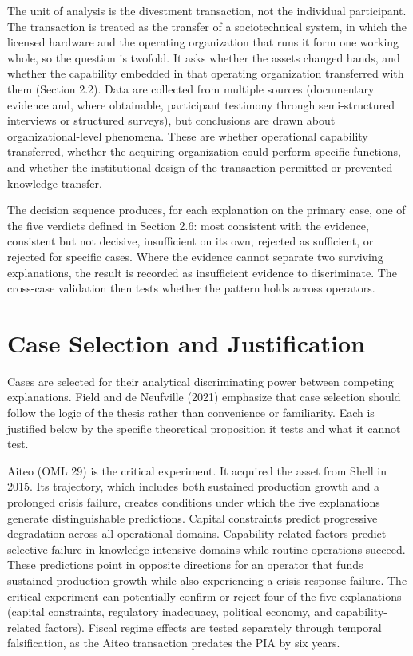 \documentclass[twoside,fontset=lmodern]{mitthesis}
\begin{document}
The unit of analysis is the divestment transaction, not the individual
participant. The transaction is treated as the transfer of a
sociotechnical system, in which the licensed hardware and the operating
organization that runs it form one working whole, so the question is
twofold. It asks whether the assets changed hands, and whether the
capability embedded in that operating organization transferred with them
(Section 2.2). Data are collected from multiple sources (documentary
evidence and, where obtainable, participant testimony through
semi-structured interviews or structured surveys), but conclusions are
drawn about organizational-level phenomena. These are whether
operational capability transferred, whether the acquiring organization
could perform specific functions, and whether the institutional design
of the transaction permitted or prevented knowledge transfer.

The decision sequence produces, for each explanation on the primary
case, one of the five verdicts defined in Section 2.6: most consistent
with the evidence, consistent but not decisive, insufficient on its own,
rejected as sufficient, or rejected for specific cases. Where the
evidence cannot separate two surviving explanations, the result is
recorded as insufficient evidence to discriminate. The cross-case
validation then tests whether the pattern holds across operators.

\hypertarget{case-selection-and-justification}{%
\section{Case Selection and
Justification}\label{case-selection-and-justification}}

Cases are selected for their analytical discriminating power between
competing explanations. Field and de Neufville (2021) emphasize that
case selection should follow the logic of the thesis rather than
convenience or familiarity. Each is justified below by the specific
theoretical proposition it tests and what it cannot test.

Aiteo (OML 29) is the critical experiment. It acquired the asset from
Shell in 2015. Its trajectory, which includes both sustained production
growth and a prolonged crisis failure, creates conditions under which
the five explanations generate distinguishable predictions. Capital
constraints predict progressive degradation across all operational
domains. Capability-related factors predict selective failure in
knowledge-intensive domains while routine operations succeed. These
predictions point in opposite directions for an operator that funds
sustained production growth while also experiencing a crisis-response
failure. The critical experiment can potentially confirm or reject four
of the five explanations (capital constraints, regulatory inadequacy,
political economy, and capability-related factors). Fiscal regime
effects are tested separately through temporal falsification, as the
Aiteo transaction predates the PIA by six years.
\end{document}
